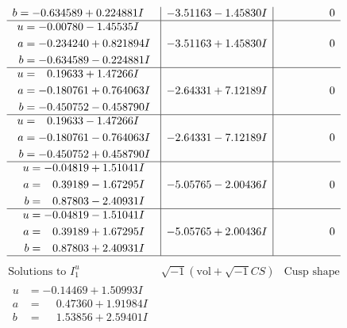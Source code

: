 \documentclass[1p]{elsarticle_modified}
\theoremstyle{definition}
\newcommand{\I}{\sqrt{-1}}
\begin{document}
$$\begin{array}{c|c|c}
\begin{aligned}
b &= -0.634589 + 0.224881 I\end{aligned}
 & -3.51163 - 1.45830 I & \phantom{-0.000000 } 0 \\ \hline\begin{aligned}
u &= -0.00780 - 1.45535 I \\
a &= -0.234240 + 0.821894 I \\
b &= -0.634589 - 0.224881 I\end{aligned}
 & -3.51163 + 1.45830 I & \phantom{-0.000000 } 0 \\ \hline\begin{aligned}
u &= \phantom{-}0.19633 + 1.47266 I \\
a &= -0.180761 + 0.764063 I \\
b &= -0.450752 - 0.458790 I\end{aligned}
 & -2.64331 + 7.12189 I & \phantom{-0.000000 } 0 \\ \hline\begin{aligned}
u &= \phantom{-}0.19633 - 1.47266 I \\
a &= -0.180761 - 0.764063 I \\
b &= -0.450752 + 0.458790 I\end{aligned}
 & -2.64331 - 7.12189 I & \phantom{-0.000000 } 0 \\ \hline\begin{aligned}
u &= -0.04819 + 1.51041 I \\
a &= \phantom{-}0.39189 - 1.67295 I \\
b &= \phantom{-}0.87803 - 2.40931 I\end{aligned}
 & -5.05765 - 2.00436 I & \phantom{-0.000000 } 0 \\ \hline\begin{aligned}
u &= -0.04819 - 1.51041 I \\
a &= \phantom{-}0.39189 + 1.67295 I \\
b &= \phantom{-}0.87803 + 2.40931 I\end{aligned}
 & -5.05765 + 2.00436 I & \phantom{-0.000000 } 0\\
 \hline 
 \end{array}$$\newpage$$\begin{array}{c|c|c}  
\text{Solutions to }I^u_{1}& \I (\text{vol} + \sqrt{-1}CS) & \text{Cusp shape}\\
 \hline 
\begin{aligned}
u &= -0.14469 + 1.50993 I \\
a &= \phantom{-}0.47360 + 1.91984 I \\
b &= \phantom{-}1.53856 + 2.59401 I\end{aligned}

\end{array}$$
\end{document}
